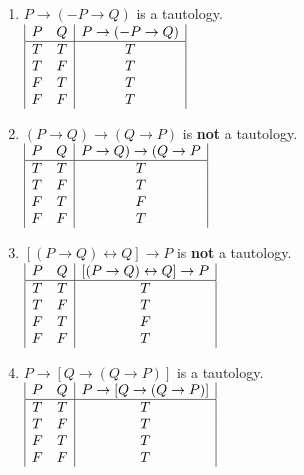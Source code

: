 \documentclass{article}
\begin{document}
\begin{enumerate}[label=(\alph*)]
\item \(P \rightarrow (-P \rightarrow Q)\) is a tautology.\\
\(
\begin{array}{|c c|c|}
P & Q & P \rightarrow (-P \rightarrow Q)\\
\hline
T & T & T\\
T & F & T\\
F & T & T\\
F & F & T\\
\end{array}
\)
\medskip

\item \((P \rightarrow Q) \rightarrow (Q \rightarrow P)\) is \textbf{not} a tautology.\\
\(
\begin{array}{|c c|c|}
P & Q & P \rightarrow Q) \rightarrow (Q \rightarrow P\\
\hline
T & T & T\\
T & F & T\\
F & T & F\\
F & F & T\\
\end{array}
\)
\medskip

\item \([(P \rightarrow Q) \leftrightarrow Q] \rightarrow P\) is \textbf{not} a tautology.\\
\(
\begin{array}{|c c|c|}
P & Q &[(P \rightarrow Q) \leftrightarrow Q] \rightarrow P\\
\hline
T & T & T\\
T & F & T\\
F & T & F\\
F & F & T\\
\end{array}
\)
\medskip

\item \(P \rightarrow [Q \rightarrow (Q \rightarrow P)]\) is a tautology.\\
\(
\begin{array}{|c c|c|}
P & Q & P \rightarrow [Q \rightarrow (Q \rightarrow P)]\\
\hline
T & T & T\\
T & F & T\\
F & T & T\\
F & F & T\\
\end{array}
\)
\medskip
\end{enumerate}
\end{document}
